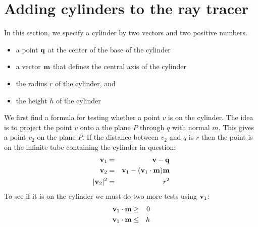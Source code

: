 \documentclass{book}
\newcommand{\vect}[1]{{\bf{ #1}}}
\begin{document}
\section{Adding cylinders to the ray tracer}
In this section, we specify a cylinder by two vectors and two positive numbers.
\begin{itemize}
\item a point ${\vect q}$ at the center of the base of the cylinder
\item a vector ${\vect m}$ that defines the central axis of the cylinder
\item the radius $r$ of the cylinder, and
\item the height $h$ of the cylinder
\end{itemize}
We first find a formula for testing whether a point $v$ is on the cylinder.
The idea is to project the point $v$ onto a the plane $P$ through $q$ with normal $m$.
This gives a point $v_2$ on the plane $P$. If the distance between $v_2$ and $q$ is $r$
then the point is on the infinite tube containing the cylinder in question:
\begin{eqnarray*}
{\vect v}_1 &=& {\vect v} - {\vect q} \\
{\vect v}_2 &=& {\vect v}_1 - ({\vect v}_1 \cdot {\vect m}) {\vect m} \\
\vert {\vect v}_2 \vert^2 &=& r^2
\end{eqnarray*}
To see if
it is on the cylinder we must do two more tests using ${\vect v}_1$:
\begin{eqnarray*}
{\vect v}_1 \cdot {\vect m} & \ge & 0 \\
{\vect v}_1 \cdot {\vect m} & \le & h
\end{eqnarray*}
\end{document}
